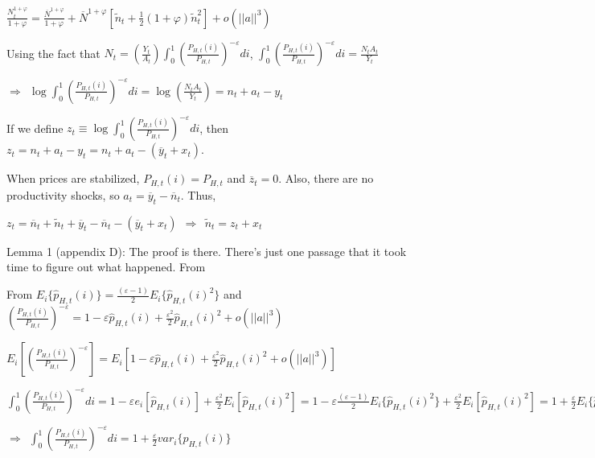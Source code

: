 \documentclass[
]{article}
\begin{document}
\(\displaystyle \frac{N_t^{1+\varphi}}{1+\varphi} = \frac{\overline{N}^{1+\varphi}}{1+\varphi} +\overline{N}^{1+\varphi}\left[ \widetilde{n}_t + \frac{1}{2}(1+\varphi)\widetilde{n}_t^2 \right] + o(||a||^3)\)

Using the fact that
\(\displaystyle N_t=\left(\frac{Y_t}{A_t} \right) \int_0^1 \left(\frac{P_{H,t}(i)}{P_{H,t}} \right)^{-\varepsilon}di\),
\(\displaystyle \int_0^1 \left(\frac{P_{H,t}(i)}{P_{H,t}} \right)^{-\varepsilon}di=\frac{N_t A_t}{Y_t}\)

\(\displaystyle \Rightarrow \ \ \log \int_0^1 \left(\frac{P_{H,t}(i)}{P_{H,t}} \right)^{-\varepsilon}di= \log \left( \frac{N_t A_t}{Y_t} \right)=n_t+a_t-y_t\)

If we define
\(\displaystyle z_t \equiv \log \int_0^1 \left(\frac{P_{H,t}(i)}{P_{H,t}} \right)^{-\varepsilon}di\),
then \(z_t=n_t+a_t-y_t=n_t+a_t-(\overline{y}_t+x_t)\).

When prices are stabilized, \(P_{H,t}(i)=P_{H,t}\) and
\(\overline{z}_t=0\). Also, there are no productivity shocks, so
\(a_t= \overline{y}_t-\overline{n}_t\). Thus,

\(z_t=\overline{n}_t+\widetilde{n}_t+\overline{y}_t-\overline{n}_t-(\overline{y}_t+x_t) \ \ \Rightarrow \ \ \widetilde{n}_t=z_t+x_t\)

Lemma 1 (appendix D): The proof is there. There's just one passage that
it took time to figure out what happened. From

From
\(\displaystyle E_i \{ \widehat{p}_{H,t}(i)\} = \frac{(\varepsilon-1)}{2}E_i \{ \widehat{p}_{H,t}(i)^2\}\)
and
\(\displaystyle \left(\frac{P_{H,t}(i)}{P_{H,t}} \right)^{-\varepsilon}=1-\varepsilon \widehat{p}_{H,t}(i)+ \frac{\varepsilon^2}{2} \widehat{p}_{H,t}(i)^2+o(||a||^3)\)

\(\displaystyle E_i\left[ \left(\frac{P_{H,t}(i)}{P_{H,t}} \right)^{-\varepsilon} \right]= E_i \left[ 1-\varepsilon \widehat{p}_{H,t}(i)+ \frac{\varepsilon^2}{2} \widehat{p}_{H,t}(i)^2+o(||a||^3) \right]\)

\(\displaystyle \int_0^1 \left(\frac{P_{H,t}(i)}{P_{H,t}} \right)^{-\varepsilon} di= 1-\varepsilon e_i[\widehat{p}_{H,t}(i)]+ \frac{\varepsilon^2}{2} E_i[\widehat{p}_{H,t}(i)^2]=1-\varepsilon \frac{(\varepsilon-1)}{2}E_i \{ \widehat{p}_{H,t}(i)^2\} + \frac{\varepsilon^2}{2} E_i[\widehat{p}_{H,t}(i)^2]=1+\frac{\varepsilon}{2}E_i \{ \widehat{p}_{H,t}(i)^2\}\)

\(\Rightarrow \ \ \displaystyle \int_0^1 \left(\frac{P_{H,t}(i)}{P_{H,t}} \right)^{-\varepsilon} di=1+\frac{\varepsilon}{2}var_i\{p_{H,t}(i)\}\)
\end{document}
